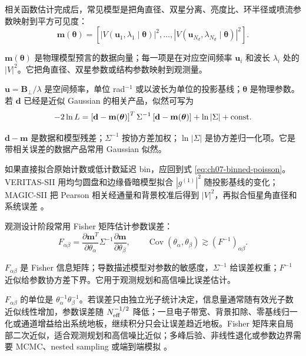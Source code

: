 相关函数估计完成后，常见模型是把角直径、双星分离、亮度比、环半径或喷流参数映射到平方可见度：
\begin{equation}
  \mathbf{m}(\boldsymbol{\theta})
  =
  \left[
  |V(\mathbf{u}_1,\lambda_1\mid\boldsymbol{\theta})|^2,
  \ldots,
  |V(\mathbf{u}_{N_d},\lambda_{N_d}\mid\boldsymbol{\theta})|^2
  \right].
  \label{eq:ch07-model-vector}
\end{equation}
\begin{formulaexplain}
\(\mathbf m(\boldsymbol\theta)\) 是物理模型预言的数据向量；每一项是在对应空间频率 \(\mathbf u_i\) 和波长 \(\lambda_i\) 处的 \(|V|^2\)。它把角直径、双星参数或结构参数映射到观测量。
\end{formulaexplain}
\(\mathbf{u}=\mathbf{B}_\perp/\lambda\) 是空间频率，单位 rad\(^{-1}\) 或以波长为单位的投影基线；\(\boldsymbol{\theta}\) 是物理参数。若 \(\mathbf{d}\) 已经是近似 Gaussian 的相关产品，似然可写为
\begin{equation}
  -2\ln L
  =
  \left[\mathbf{d}-\mathbf{m}(\boldsymbol{\theta})\right]^T
  \Sigma^{-1}
  \left[\mathbf{d}-\mathbf{m}(\boldsymbol{\theta})\right]
  +\ln |\Sigma| + {\rm const}.
  \label{eq:ch07-gaussian-likelihood}
\end{equation}
\begin{formulaexplain}
\(\mathbf d-\mathbf m\) 是数据和模型残差；\(\Sigma^{-1}\) 按协方差加权；\(\ln|\Sigma|\) 是协方差归一化项。它是带相关误差的数据产品常用 Gaussian 似然。
\end{formulaexplain}
如果直接拟合原始计数或低计数延迟 bin，应回到式 \eqref{eq:ch07-binned-poisson}。VERITAS-SII 用均匀圆盘和边缘昏暗模型拟合 \(|g^{(1)}|^2\) 随投影基线的变化；MAGIC-SII 把 Pearson 相关经通量和背景校准后得到 \(|V|^2\)，再拟合恒星角直径和系统误差 \citep{2020NatAs...4.1164A,2024MNRAS.529.4387A,1967MNRAS.137..375H}。

观测设计阶段常用 Fisher 矩阵估计参数误差：
\begin{equation}
  F_{\alpha\beta}
  =
  \frac{\partial \mathbf{m}^T}{\partial \theta_\alpha}
  \Sigma^{-1}
  \frac{\partial \mathbf{m}}{\partial \theta_\beta},
  \qquad
  \operatorname{Cov}(\theta_\alpha,\theta_\beta)
  \gtrsim
  (F^{-1})_{\alpha\beta}.
  \label{eq:ch07-fisher}
\end{equation}
\begin{formulaexplain}
\(F_{\alpha\beta}\) 是 Fisher 信息矩阵；导数描述模型对参数的敏感度，\(\Sigma^{-1}\) 给误差权重；\(F^{-1}\) 近似给参数协方差下界。它用于观测规划和高信噪比误差估计。
\end{formulaexplain}
\(F_{\alpha\beta}\) 的单位是 \(\theta_\alpha^{-1}\theta_\beta^{-1}\)。若误差只由独立光子统计决定，信息量通常随有效光子数近似线性增加，参数误差随 \(N_{\rm eff}^{-1/2}\) 降低；一旦电子带宽、背景扣除、零基线归一化或通道增益给出系统地板，继续积分只会让误差趋近地板。Fisher 矩阵来自局部二次近似，适合观测规划和高信噪比近似；多峰后验、非线性退化或参数边界需要 MCMC、nested sampling 或端到端模拟 \citep{1925PCPS...22..700F,2013PASP..125..306F,2009MNRAS.398.1601F}。


